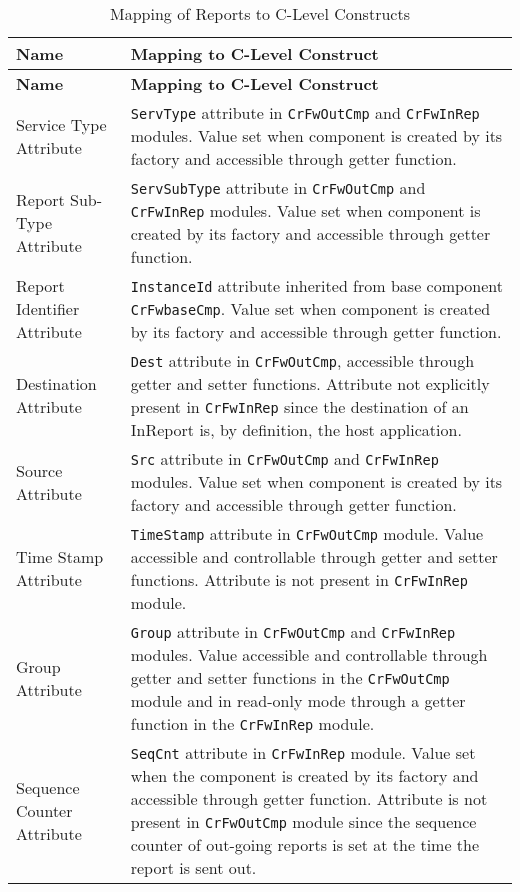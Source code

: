 \documentclass{pnp_article}
\begin{document}
\begin{longtable}{|>{\raggedright}p{2.0cm}|p{11.3cm}|}
\caption{Mapping of Reports to C-Level Constructs} \label{tab:RepConceptMapping}\\
\hline
\rowcolor{light-gray}
\textbf{Name} & \textbf{Mapping to C-Level Construct} \\
\hline\hline
\endfirsthead
\rowcolor{light-gray}
\textbf{Name} & \textbf{Mapping to C-Level Construct} \\
\hline\hline
\endhead
Service Type Attribute & \texttt{ServType} attribute in \texttt{CrFwOutCmp} and \texttt{CrFwInRep} modules. Value set when component is created by its factory and accessible through getter function. \\
\hline
Report Sub-Type Attribute & \texttt{ServSubType} attribute in \texttt{CrFwOutCmp} and \texttt{CrFwInRep} modules. Value set when component is created by its factory and accessible through getter function. \\
\hline
Report Identifier Attribute & \texttt{InstanceId} attribute inherited from base component \texttt{CrFwbaseCmp}. Value set when component is created by its factory and accessible through getter function. \\
\hline
Destination Attribute & \texttt{Dest} attribute in \texttt{CrFwOutCmp}, accessible through getter and setter functions. Attribute not explicitly present in \texttt{CrFwInRep} since the destination of an InReport is, by definition, the host application. \\
\hline
Source Attribute & \texttt{Src} attribute in \texttt{CrFwOutCmp} and \texttt{CrFwInRep} modules. Value set when component is created by its factory and accessible through getter function. \\
\hline
Time Stamp Attribute & \texttt{TimeStamp} attribute in \texttt{CrFwOutCmp} module. Value accessible and controllable through getter and setter functions. Attribute is not present in \texttt{CrFwInRep} module. \\
\hline
Group Attribute & \texttt{Group} attribute in \texttt{CrFwOutCmp} and \texttt{CrFwInRep} modules. Value accessible and controllable through getter and setter functions in the \texttt{CrFwOutCmp} module and in read-only mode through a getter function in the \texttt{CrFwInRep} module.  \\
\hline
Sequence Counter Attribute & \texttt{SeqCnt} attribute in \texttt{CrFwInRep} module. Value set when the component is created by its factory and accessible through getter function. Attribute is not present in \texttt{CrFwOutCmp} module since the sequence counter of out-going reports is set at the time the report is sent out. \\

\end{longtable}
\end{document}
